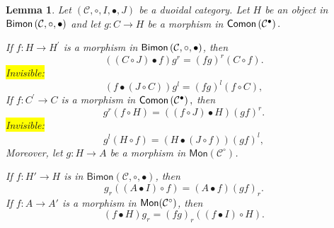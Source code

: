\documentclass[nosumlimits,twoside]{amsart}
\newtheorem{lemma}[lemma]{\sc Lemma}
\theoremstyle{definition}
\theoremstyle{remark}
\newenvironment{invisible}{{\noindent\sc \colorbox{yellow}{Invisible:}\;}\color{gray}}{\medskip}
\newcommand{\Cc}{\mathcal{C}}
\def\Bimon{{\sf Bimon}}
\def\Comon{{\sf Comon}}
\def\Mon{{\sf Mon}}
\begin{document}
\begin{lemma}
\label{lem:grnat}
Let $\left( \mathcal{C},\circ ,I,\bullet ,J\right) $ be a duoidal category. Let $H$ be an object in $\Bimon \left( \mathcal{C},\circ,\bullet\right) $ and let $%
g:C\rightarrow H$ be a morphism in $\Comon \left( \mathcal{C}%
^{\bullet }\right) .$

If $f:H\rightarrow H^{\prime }$ is a morphism in $\Bimon \left(
\mathcal{C},\circ,\bullet\right) $, then%
\begin{equation}\label{form:grnat1}
\left( \left( C\circ J\right) \bullet f\right) g^{r}=\left( fg\right)
^{r}\left( C\circ f\right) .
\end{equation}%
\begin{invisible}
\begin{equation*}\label{form:glnat1}
\left( f\bullet \left( J\circ C\right) \right) g^{l} =\left( fg\right)
^{l}\left( f\circ C\right) ,
\end{equation*}
\end{invisible}
If $f:C^{\prime }\rightarrow C$ is a morphism in $\Comon \left(
\mathcal{C}^{\bullet }\right) ,$ then
\begin{equation}\label{form:grnat2}
g^{r}\left( f\circ H\right)  =\left( \left( f\circ J\right) \bullet
H\right) \left( gf\right) ^{r}.
\end{equation}
\begin{invisible}
\begin{equation*}\label{form:glnat2}
g^{l}\left( H\circ f\right)  =\left( H\bullet \left( J\circ f\right)
\right) \left( gf\right) ^{l},
\end{equation*}
\end{invisible}
Moreover, let $g:H\to A$ be a morphism in $\mathsf{Mon}(\Cc^{\circ})$.

If $f:H'\to H$ is in $\mathsf{Bimon}(\Cc,\circ,\bullet)$, then
\begin{equation}\label{formgrnat1}
   g_{r}((A\bullet I)\circ f)  =(A\bullet f)(gf)_{r}.
\end{equation}
If $f:A\to A'$ is a morphism in $\Mon(\Cc^\circ)$,
then
\begin{equation}\label{formgrnat2}
(f\bullet H)g_{r}= (fg)_{r}((f\bullet I)\circ H).
\end{equation}
\end{lemma}
\end{document}
